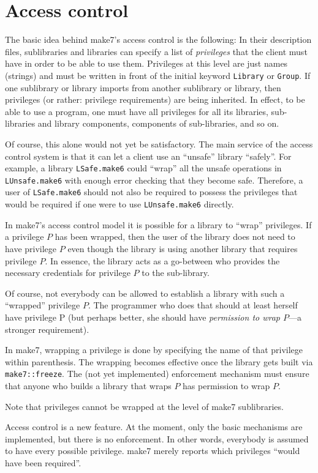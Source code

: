 
\section{Access control}
\label{sec:access}

The basic idea behind make7's access control is the following: In their
description files, sublibraries and libraries can specify a list of
{\em privileges} that the client must have in order to be able to use them.
Privileges at this level are just names (strings) and must be written
in front of the initial keyword {\tt Library} or {\tt Group}.  If one
sublibrary or library imports from another sublibrary or library, then
privileges (or rather: privilege requirements) are being inherited.
In effect, to be able to use a program, one must have all privileges
for all its libraries, sub-libraries and library components,
components of sub-libraries, and so on.

Of course, this alone would not yet be satisfactory.  The main service
of the access control system is that it can let a client use an
``unsafe'' library ``safely''.  For example, a library {\tt LSafe.make6}
could ``wrap'' all the unsafe operations in {\tt LUnsafe.make6} with
enough error checking that they become safe.  Therefore, a user of
{\tt LSafe.make6} should not also be required to possess the privileges
that would be required if one were to use {\tt LUnsafe.make6} directly.

In make7's access control model it is possible for a library to ``wrap''
privileges.  If a privilege $P$ has been wrapped, then the user of the
library does not need to have privilege $P$ even though the library is
using another library that requires privilege $P$.  In essence, the
library acts as a go-between who provides the necessary credentials
for privilege $P$ to the sub-library.

Of course, not everybody can be allowed to establish a library with
such a ``wrapped'' privilege $P$.  The programmer who does that should at
least herself have privilege P (but perhaps better, she should have
{\em permission to wrap $P$}---a stronger requirement).

In make7, wrapping a privilege is done by specifying the name of that
privilege within parenthesis.  The wrapping becomes effective once the
library gets built via {\tt make7::freeze}.  The (not yet
implemented) enforcement mechanism must ensure that anyone who
builds a library that wraps $P$ has permission to wrap $P$.

Note that privileges cannot be wrapped at the level of make7 sublibraries.

Access control is a new feature. At the moment, only the basic
mechanisms are implemented, but there is no enforcement.  In other
words, everybody is assumed to have every possible privilege.  make7
merely reports which privileges ``would have been required''.
